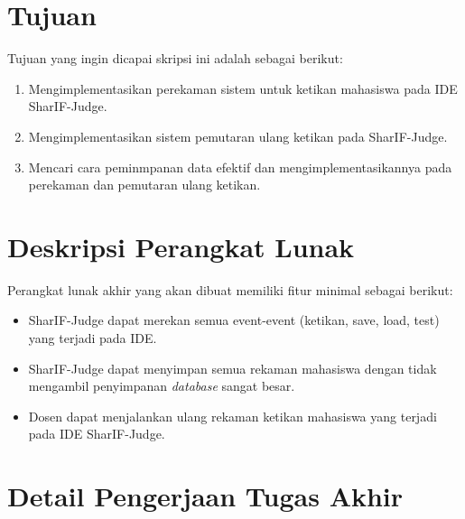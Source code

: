 \documentclass[a4paper,twoside]{article}
\begin{document}
\section{Tujuan}
Tujuan yang ingin dicapai skripsi ini adalah sebagai berikut:
    \begin{enumerate}
        \item Mengimplementasikan perekaman sistem untuk ketikan mahasiswa pada IDE SharIF-Judge.
        \item Mengimplementasikan sistem pemutaran ulang ketikan pada SharIF-Judge.
        \item Mencari cara peminmpanan data efektif dan mengimplementasikannya pada perekaman dan pemutaran ulang ketikan. 
    \end{enumerate}

\section{Deskripsi Perangkat Lunak}

Perangkat lunak akhir yang akan dibuat memiliki fitur minimal sebagai berikut:
\begin{itemize}
	\item SharIF-Judge dapat merekan semua event-event (ketikan, save, load, test) yang terjadi pada IDE.
    \item SharIF-Judge dapat menyimpan semua rekaman mahasiswa dengan tidak mengambil penyimpanan \textit{database} sangat besar.
    \item Dosen dapat menjalankan ulang rekaman ketikan mahasiswa yang terjadi pada IDE SharIF-Judge.

		
\end{itemize}

\section{Detail Pengerjaan Tugas Akhir}
\end{document}
